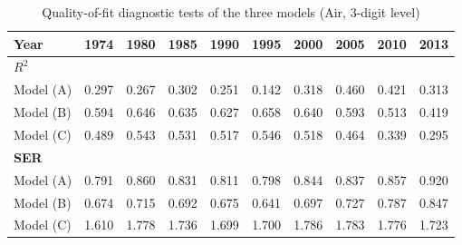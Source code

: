 \documentclass[11pt,twoside, authoryear]{elsarticle}
\begin{document}
\begin{landscape}
\begin{table}[htbp]
  \centering
  \footnotesize{
  \caption{Quality-of-fit diagnostic tests of the three models (Air, 3-digit level)}
    \label{tab:3models_diagnosis_air}%
   \begin{tabular}{l|c|c|c|c|c|c|c|c|c}
    \hline \hline
    \textbf{Year} & \multicolumn{1}{c}{\textbf{1974}} & \multicolumn{1}{c}{\textbf{1980}} & \multicolumn{1}{c}{\textbf{1985}} & \multicolumn{1}{c}{\textbf{1990}} & \multicolumn{1}{c}{\textbf{1995}} & \multicolumn{1}{c}{\textbf{2000}} & \multicolumn{1}{c}{\textbf{2005}} & \multicolumn{1}{c}{\textbf{2010}} & \multicolumn{1}{c}{\textbf{2013}} \\ \hline
    \multicolumn{10}{l}{\textbf{$R^2$}} \\ \hline
    Model (A) & \multicolumn{1}{c}{0.297} & \multicolumn{1}{c}{0.267} & \multicolumn{1}{c}{0.302} & \multicolumn{1}{c}{0.251} & \multicolumn{1}{c}{0.142} & \multicolumn{1}{c}{0.318} & \multicolumn{1}{c}{0.460} & \multicolumn{1}{c}{0.421} & \multicolumn{1}{c}{0.313} \\
    Model (B) & \multicolumn{1}{c}{0.594} & \multicolumn{1}{c}{0.646} & \multicolumn{1}{c}{0.635} & \multicolumn{1}{c}{0.627} & \multicolumn{1}{c}{0.658} & \multicolumn{1}{c}{0.640} & \multicolumn{1}{c}{0.593} & \multicolumn{1}{c}{0.513} & \multicolumn{1}{c}{0.419} \\
    Model (C) & \multicolumn{1}{c}{0.489} & \multicolumn{1}{c}{0.543} & \multicolumn{1}{c}{0.531} & \multicolumn{1}{c}{0.517} & \multicolumn{1}{c}{0.546} & \multicolumn{1}{c}{0.518} & \multicolumn{1}{c}{0.464} & \multicolumn{1}{c}{0.339} & \multicolumn{1}{c}{0.295} \\ \hline
    \multicolumn{10}{l}{\textbf{SER}}\\ \hline
    Model (A) & \multicolumn{1}{c}{0.791} & \multicolumn{1}{c}{0.860} & \multicolumn{1}{c}{0.831} & \multicolumn{1}{c}{0.811} & \multicolumn{1}{c}{0.798} & \multicolumn{1}{c}{0.844} & \multicolumn{1}{c}{0.837} & \multicolumn{1}{c}{0.857} & \multicolumn{1}{c}{0.920} \\
    Model (B) & \multicolumn{1}{c}{0.674} & \multicolumn{1}{c}{0.715} & \multicolumn{1}{c}{0.692} & \multicolumn{1}{c}{0.675} & \multicolumn{1}{c}{0.641} & \multicolumn{1}{c}{0.697} & \multicolumn{1}{c}{0.727} & \multicolumn{1}{c}{0.787} & \multicolumn{1}{c}{0.847} \\
    Model (C) & \multicolumn{1}{c}{1.610} & \multicolumn{1}{c}{1.778} & \multicolumn{1}{c}{1.736} & \multicolumn{1}{c}{1.699} & \multicolumn{1}{c}{1.700} & \multicolumn{1}{c}{1.786} & \multicolumn{1}{c}{1.783} & \multicolumn{1}{c}{1.776} & \multicolumn{1}{c}{1.723} \\ \hline

\end{tabular}}
\end{table}
\end{landscape}
\end{document}
